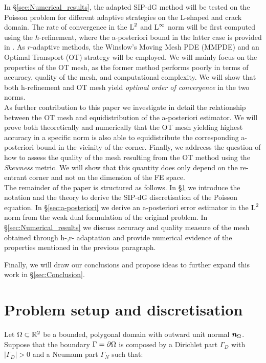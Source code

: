 \documentclass[a4paper,11pt]{article}
\begin{document}
{\begin{itemize}
\end{itemize}

In \S \ref{sec:Numerical_results}, the adapted SIP-dG method will be tested on the Poisson problem for different adaptive strategies on the L-shaped and crack domain. The rate of convergence in the $\operatorname L^{2}$ and $\operatorname L^{\infty}$ norm will be first computed using the $h$-refinement, where the a-posteriori bound in the latter case is provided in  \cite{DG:2012}. As $r$-adaptive methods, the Winslow's Moving Mesh PDE (MMPDE) and an Optimal Transport (OT) strategy will be employed. We will mainly focus on the properties of the OT mesh, as the former method performs poorly in terms of accuracy, quality of the mesh, and computational complexity. We will show that both  h-refinement and OT mesh yield \textit{optimal order of convergence} in the two norms. \\

As further contribution to this paper we investigate in detail the relationship between the OT mesh and equidistribution of the a-posteriori estimator. We will prove both theoretically and numerically that the OT mesh yielding highest accuracy in a specific norm is also able to equidistribute the corresponding a-posteriori bound in the vicinity of the corner.
Finally, we addreess the question of how to assess the quality of the mesh resulting from the OT method using the \textit{Skewness} metric. We will show that this quantity does only depend on the re-entrant corner and not on the dimension of the FE space.\\

The remainder of the paper is structured as follows. In \S \ref{sec:Problem_setup_discretisation} we introduce the notation and the theory to derive the SIP-dG discretisation of the Poisson equation. In \S \ref{sec:a-posteriori} we derive an a-posteriori error estimator in the $\operatorname L^{2}$ norm from the weak dual formulation of the original problem. In \S \ref{sec:Numerical_results} we discuss accuracy and quality measure of the mesh obtained through h-,r- adaptation and provide numerical evidence of the properties mentioned in the previous paragraph.

Finally, we will draw our conclusions and propose ideas to further expand this work in \S \ref{sec:Conclusion}.

\section{Problem setup and discretisation}
\label{sec:Problem_setup_discretisation}
Let $\Omega \subset \mathbb R^{2}$ be a bounded, polygonal domain with outward unit normal $\boldsymbol n_{\Omega}$. Suppose that the boundary $\Gamma = \partial \Omega$ is composed by a Dirichlet part $\Gamma_{D}$ with $|\Gamma_{D}| > 0$ and a Neumann part $\Gamma_{N}$ such that:


}
\end{document}
